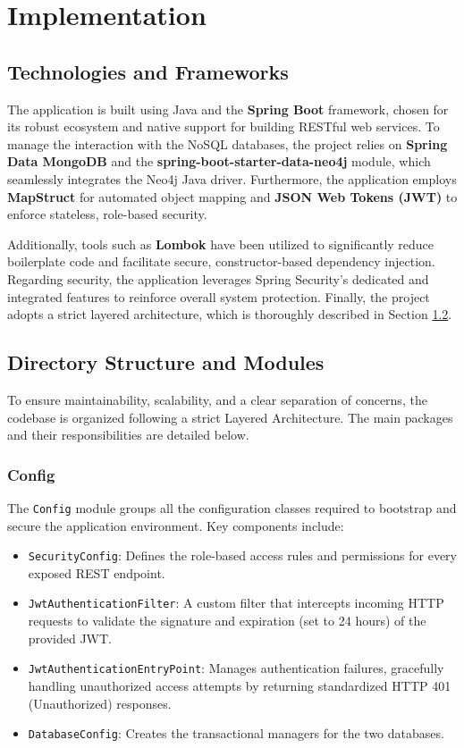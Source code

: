 \chapter{Implementation}

\section{Technologies and Frameworks}
The application is built using Java and the \textbf{Spring Boot} framework, chosen for its robust ecosystem and native support for building RESTful web services. To manage the interaction with the NoSQL databases, the project relies on \textbf{Spring Data MongoDB} and the \textbf{spring-boot-starter-data-neo4j} module, which seamlessly integrates the Neo4j Java driver. Furthermore, the application employs \textbf{MapStruct} for automated object mapping and \textbf{JSON Web Tokens (JWT)} to enforce stateless, role-based security.

Additionally, tools such as \textbf{Lombok} have been utilized to significantly reduce boilerplate code and facilitate secure, constructor-based dependency injection. Regarding security, the application leverages Spring Security's dedicated and integrated features to reinforce overall system protection. Finally, the project adopts a strict layered architecture, which is thoroughly described in Section \ref{sec:directory_structure}.

\section{Directory Structure and Modules}
\label{sec:directory_structure}
To ensure maintainability, scalability, and a clear separation of concerns, the codebase is organized following a strict Layered Architecture. The main packages and their responsibilities are detailed below.

\subsection{Config}
The \texttt{Config} module groups all the configuration classes required to bootstrap and secure the application environment. Key components include:
\begin{itemize}
    \item \texttt{SecurityConfig}: Defines the role-based access rules and permissions for every exposed REST endpoint.
    \item \texttt{JwtAuthenticationFilter}: A custom filter that intercepts incoming HTTP requests to validate the signature and expiration (set to 24 hours) of the provided JWT.
    \item \texttt{JwtAuthenticationEntryPoint}: Manages authentication failures, gracefully handling unauthorized access attempts by returning standardized HTTP 401 (Unauthorized) responses.
    \item \texttt{DatabaseConfig}: Creates the transactional managers for the two databases.
\end{itemize}

